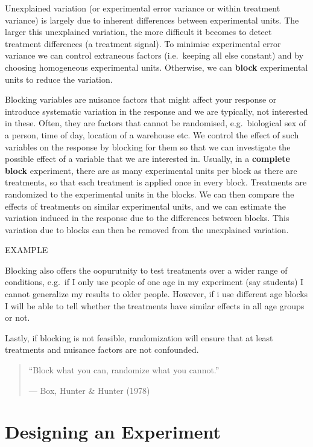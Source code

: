 \documentclass[
  letterpaper,
  DIV=11,
  numbers=noendperiod,
  oneside]{scrreprt}
\begin{document}
Unexplained variation (or experimental error variance or within
treatment variance) is largely due to inherent differences between
experimental units. The larger this unexplained variation, the more
difficult it becomes to detect treatment differences (a treatment
signal). To minimise experimental error variance we can control
extraneous factors (i.e.~keeping all else constant) and by choosing
homogeneous experimental units. Otherwise, we can \textbf{block}
experimental units to reduce the variation.

Blocking variables are nuisance factors that might affect your response
or introduce systematic variation in the response and we are typically,
not interested in these. Often, they are factors that cannot be
randomised, e.g.~biological sex of a person, time of day, location of a
warehouse etc. We control the effect of such variables on the response
by blocking for them so that we can investigate the possible effect of a
variable that we are interested in. Usually, in a \textbf{complete
block} experiment, there are as many experimental units per block as
there are treatments, so that each treatment is applied once in every
block. Treatments are randomized to the experimental units in the
blocks. We can then compare the effects of treatments on similar
experimental units, and we can estimate the variation induced in the
response due to the differences between blocks. This variation due to
blocks can then be removed from the unexplained variation.

EXAMPLE

Blocking also offers the oopurutnity to test treatments over a wider
range of conditions, e.g.~if I only use people of one age in my
experiment (say students) I cannot generalize my results to older
people. However, if i use different age blocks I will be able to tell
whether the treatments have similar effects in all age groups or not.

Lastly, if blocking is not feasible, randomization will ensure that at
least treatments and nuisance factors are not confounded.

\begin{quote}
``Block what you can, randomize what you cannot.''

--- Box, Hunter \& Hunter (1978)
\end{quote}

\chapter{Designing an Experiment}\label{designing-an-experiment}
\end{document}
